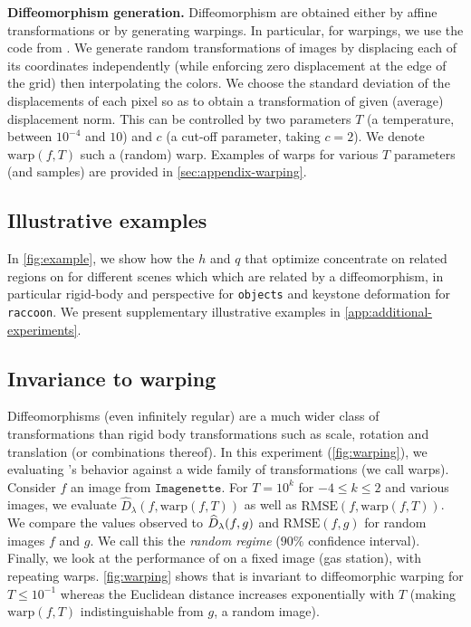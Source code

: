 \textbf{Diffeomorphism generation.} Diffeomorphism are obtained either by affine transformations or by generating warpings. In particular, for warpings, we use the code from \cite{wyartdiffeo}. We generate random transformations of images by displacing each of its coordinates independently (while enforcing zero displacement at the edge of the grid) then interpolating the colors.  We choose the standard deviation of the displacements of each pixel so as to obtain a transformation of given (average) displacement norm. This can be controlled by two parameters $T$ (a temperature, between $10^{-4}$ and $10$) and $c$ (a cut-off parameter, taking $c=2$). We denote $\text{warp}(f, T)$ such a (random) warp. Examples of warps for various $T$ parameters (and samples) are provided in \cref{sec:appendix-warping}.

\subsection{Illustrative examples}\label{sec:illustration}

In \cref{fig:example}, we show how the $h$ and $q$ that optimize \Diffy concentrate on related regions on for different scenes which which are related by a diffeomorphism, in particular rigid-body and perspective for \texttt{objects} and keystone deformation for \texttt{raccoon}. We present supplementary illustrative examples in \cref{app:additional-experiments}.

\subsection{Invariance to warping}\label{sec:invariance-warping}
Diffeomorphisms (even infinitely regular) are a much wider class of transformations than rigid body transformations such as scale, rotation and translation (or combinations thereof). In this experiment (\cref{fig:warping}), we evaluating \Diffy's behavior against a wide family of transformations (we call warps). Consider $f$ an image from $\texttt{Imagenette}$. For $T = 10^{k}$ for $-4 \leq k \leq 2$ and various images, we evaluate $\widehat D_\lambda(f, \text{warp}(f, T))$ as well as $\textrm{RMSE}(f, \text{warp}(f, T))$. We compare the values observed to $\widehat D_\lambda(f, g)$ and $\textrm{RMSE}(f, g)$ for random images $f$ and $g$. We call this the \emph{random regime} ($90\%$ confidence interval). Finally, we look at the performance of \Diffy on a fixed image (gas station), with repeating warps. \cref{fig:warping} shows that \Diffy is invariant to diffeomorphic warping for $T \leq 10^{-1}$ whereas the Euclidean distance increases exponentially with $T$ (making $\text{warp}(f, T)$ indistinguishable from $g$, a random image).

